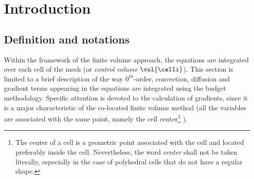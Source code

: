 
%
%
%
%


\section{Introduction}

\subsection{Definition and notations}\label{sec:spadis:notations}

Within the framework of the finite volume approach, the equations are
integrated over each cell of the mesh (or \emph{control volume} $\vol{\celli}$).
This section is limited to a brief description of the way $0^{th}$-order, convection, diffusion and gradient terms appearing in
the equations are integrated using the budget methodology. Specific attention is devoted to the
calculation of gradients, since it is a major characteristic of the
co-located finite volume method (all the variables are associated with the
same point, namely the cell center\footnote{%
The center of a cell is a geometric point associated with the cell and
located preferably inside the cell. Nevertheless, the word \emph{center} shall
not be taken literally,
especially in the case of polyhedral cells that do not have a regular shape.}%
).

